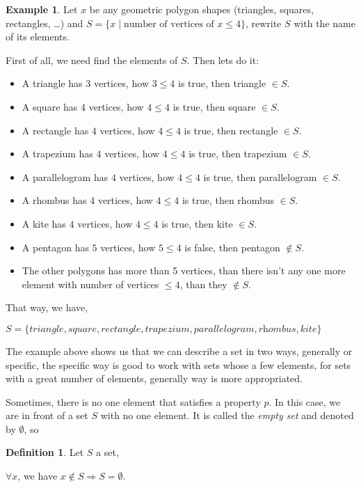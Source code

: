 \documentclass[11pt, a4paper]{amsart}
\numberwithin{equation}{section}
\theoremstyle{plain} %
\theoremstyle{definition}
\newtheorem{defn}{Definition}[section]
\newtheorem{ex}{Example}[section]
\theoremstyle{remark}
\begin{document}
\begin{ex}
Let $x$ be any geometric polygon shapes (triangles, squares, rectangles, \dots) and $S=\lbrace x \mid \text{number of vertices of }x \leq 4\rbrace$, rewrite $S$ with the name of its elements.

First of all, we need find the elements of $S$. Then lets do it:
\begin{itemize}
  \item A triangle has $3$ vertices, how $3\leq4$ is true, then triangle $\in S$.
  \item A square has $4$ vertices, how $4\leq4$ is true, then square $\in S$.
  \item A rectangle has $4$ vertices, how $4\leq4$ is true, then rectangle $\in S$.
  \item A trapezium has $4$ vertices, how $4\leq4$ is true, then trapezium $\in S$.
  \item A parallelogram has $4$ vertices, how $4\leq4$ is true, then parallelogram $\in S$.
  \item A rhombus has $4$ vertices, how $4\leq4$ is true, then rhombus $\in S$.
  \item A kite has $4$ vertices, how $4\leq4$ is true, then kite $\in S$.
  \item A pentagon has $5$ vertices, how $5\leq4$ is false, then pentagon $\notin S$.
  \item The other polygons has more than 5 vertices, than there isn't any one more element with number of vertices $\leq4$, than they $\notin S$.
\end{itemize}

That way, we have,
\begin{center}
    $S=\lbrace\textit{triangle}, \textit{square}, \textit{rectangle}, \textit{trapezium}, \textit{parallelogram}, \textit{rhombus}, \textit{kite}\rbrace$
\end{center}
\end{ex}
The example above shows us that we can describe a set in two ways, generally or specific, the specific way is good to work with sets whose a few elements, for sets with a great number of elements, generally way is more appropriated.

Sometimes, there is no one element that satisfies a property $p$. In this case, we are in front of a set $S$ with no one element. It is called the \textit{empty set} and denoted by $\emptyset$, so

\begin{defn}
Let $S$ a set,
\begin{center}
    $\forall x$, we have $x \notin S\Rightarrow S=\emptyset$.
\end{center}
\end{defn}
\end{document}
